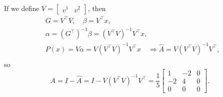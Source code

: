 \documentclass[letterpaper]{article}
\begin{document}
\begin{enumerate}
        If we define $V= \begin{bmatrix}v^{1} & v^{2}\end{bmatrix}$, then
        \begin{equation*}
          \begin{split}
            &G = V^\top V,\quad \beta = V^\top x,\\
            &\alpha =(G^\top )^{-1}\beta=(V^\top V)^{-1}V^\top x,\\
            &P(x)=V\alpha=V(V^\top V)^{-1}V^\top x \quad\Rightarrow \hat{A}=V(V^\top V)^{-1}V^\top, \\
          \end{split}
        \end{equation*}
        so
        \begin{equation*}
          A=I-\hat{A}=I-V(V^\top V)^{-1}V^\top=\dfrac{1}{5}\begin{bmatrix}1 &-2& 0\\ -2 & 4 & 0\\ 0 & 0 & 0\end{bmatrix}.
        \end{equation*}


\end{enumerate}
\end{document}
